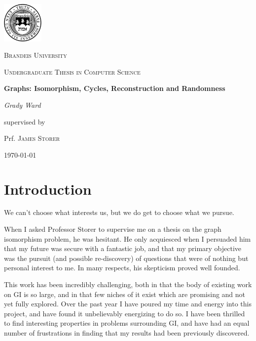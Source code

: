 \documentclass[11pt,a4paper]{report}
\begin{document}
\nocite{*}

\begin{titlepage}
	\centering
	\includegraphics[width=0.15\textwidth]{brandeis-seal}\par\vspace{1cm}
	{\scshape\LARGE Brandeis University \par}
	\vspace{1cm}
	{\scshape\Large Undergraduate Thesis in Computer Science\par}
	\vspace{1.5cm}
	{\huge\bfseries Graphs: Isomorphism, Cycles, Reconstruction and Randomness\par}
	\vspace{2cm}
	{\Large\itshape Grady Ward\par}
	\vfill
	supervised by\par
	Prf. \textsc{James Storer}
	\vfill

	{\large \today\par}
\end{titlepage}

\tableofcontents

\chapter*{Introduction}
We can't choose what interests us, but we do get to choose what we pursue.

When I asked Professor Storer to supervise me on a thesis on the graph isomorphism problem, he was hesitant.
He only acquiesced when I persuaded him that my future was secure with a fantastic job, and that my primary objective was the pursuit (and possible re-discovery) of questions that were of nothing but personal interest to me.
In many respects, his skepticism proved well founded.

This work has been incredibly challenging, both in that the body of existing work on GI is so large, and in that few niches of it exist which are promising and not yet fully explored.
Over the past year I have poured my time and energy into this project, and have found it unbelievably energizing to do so.
I have been thrilled to find interesting properties in problems surrounding GI, and have had an equal number of frustrations in finding that my results had been previously discovered.
\end{document}

